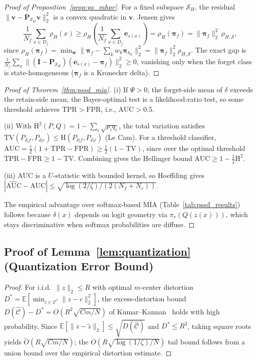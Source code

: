 \documentclass[smallextended]{svjour3}       %
\begin{document}
\begin{proof}[Proof of Proposition~\ref{prop:ps_mhpr}]
For a fixed subspace $\mathcal{S}_H$, the residual $\|\mathbf{v}-\mathbf{P}_{\mathcal{S}_H}\mathbf{v}\|_2^2$ is a convex quadratic in $\mathbf{v}$. Jensen gives
\[
\frac1{N_f}\sum_{x\in D_f}\rho_H(x) \ge \rho_H\!\left(\frac1{N_f}\sum_{x\in D_f}\mathbf{e}_{s(x)}\right) = \rho_H(\boldsymbol{\pi}_f) = \|\boldsymbol{\pi}_f\|_2^2\,\rho_{H,\mathcal{S}},
\]
since $\rho_H(\boldsymbol{\pi}_f)=\min_{\mathbf{w}}\|\boldsymbol{\pi}_f-\sum_k w_k\boldsymbol{\pi}_{h_k}\|_2^2=\|\boldsymbol{\pi}_f\|_2^2\rho_{H,\mathcal{S}}$. The exact gap is $\frac1{N_f}\sum_x\|(\mathbf{I}-\mathbf{P}_{\mathcal{S}_H})(\mathbf{e}_{s(x)}-\boldsymbol{\pi}_f)\|_2^2\ge0$, vanishing only when the forget class is state-homogeneous ($\boldsymbol{\pi}_f$ is a Kronecker delta).
\end{proof}

\begin{proof}[Proof of Theorem~\ref{thm:pssd_mia}]
(i) If $\Psi>0$, the forget-side mean of $\delta$ exceeds the retain-side mean; the Bayes-optimal test is a likelihood-ratio test, so some threshold achieves $\mathrm{TPR}>\mathrm{FPR}$, i.e., $\mathrm{AUC}>0.5$.

(ii) With $\mathrm{H}^2(P,Q)=1-\sum_i\sqrt{p_iq_i}$, the total variation satisfies $\mathrm{TV}(P_{\delta|f},P_{\delta|r})\le\mathrm{H}(P_{\delta|f},P_{\delta|r})$ (Le Cam). For a threshold classifier, $\mathrm{AUC}=\frac12(1+\mathrm{TPR}-\mathrm{FPR})\ge\frac12(1-\mathrm{TV})$, since over the optimal threshold $\mathrm{TPR}-\mathrm{FPR}\ge1-\mathrm{TV}$. Combining gives the Hellinger bound $\mathrm{AUC}\ge1-\frac12\mathrm{H}^2$.

(iii) AUC is a $U$-statistic with bounded kernel, so Hoeffding gives $|\widehat{\mathrm{AUC}}-\mathrm{AUC}|\le\sqrt{\log(2/\zeta)/(2(N_f+N_r))}$.

The empirical advantage over softmax-based MIA (Table~\ref{tab:pssd_results}) follows because $\delta(x)$ depends on logit geometry via $\pi_r(Q(z(x)))$, which stays discriminative when softmax probabilities are diffuse.
\end{proof}

\subsection{Proof of Lemma~\ref{lem:quantization} (Quantization Error Bound)}
\begin{proof}
For i.i.d.\ $\|z\|_2\le R$ with optimal $m$-center distortion $D^*=\mathbb{E}[\min_{c\in\mathcal{C}^*}\|z-c\|_2^2]$, the excess-distortion bound $D(\hat{\mathcal{C}})-D^*=O(R^2\sqrt{Cm/N})$ of Kumar--Kannan~\cite{kumar2010clustering} holds with high probability. Since $\mathbb{E}[\|z-\tilde{z}\|_2]\le\sqrt{D(\hat{\mathcal{C}})}$ and $D^*\le R^2$, taking square roots yields $\tilde{O}(R\sqrt{Cm/N})$; the $O(R\sqrt{\log(1/\zeta)/N})$ tail bound follows from a union bound over the empirical distortion estimate.
\end{proof}
\end{document}

